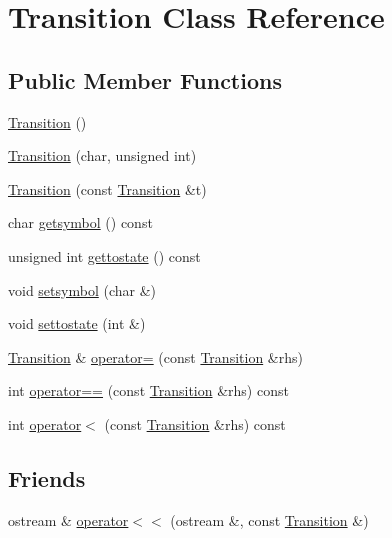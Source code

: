 \hypertarget{classTransition}{}\section{Transition Class Reference}
\label{classTransition}
\subsection*{Public Member Functions}
\begin{DoxyCompactItemize}
\item 
\hyperlink{classTransition_a73b44b2338b11807f77b620a3e810f92}{Transition} ()
\item 
\hyperlink{classTransition_ab49cf908eba3466ddcd65b144d3c2fc4}{Transition} (char, unsigned int)
\item 
\hyperlink{classTransition_a3a95a02ec9471b3af89c3f1b947048fc}{Transition} (const \hyperlink{classTransition}{Transition} \&t)
\item 
char \hyperlink{classTransition_a26d9d8a40925443d053594fedeae812f}{getsymbol} () const 
\item 
unsigned int \hyperlink{classTransition_a2cd33705526d2cf4806605b5bd18c46b}{gettostate} () const 
\item 
void \hyperlink{classTransition_a5a20b15b7f4ab032742ad6391190cc6e}{setsymbol} (char \&)
\item 
void \hyperlink{classTransition_a6534cb4975a33db21fc273e578c32ff1}{settostate} (int \&)
\item 
\hyperlink{classTransition}{Transition} \& \hyperlink{classTransition_aff02d7ec6996e757e62e863f09dda47e}{operator=} (const \hyperlink{classTransition}{Transition} \&rhs)
\item 
int \hyperlink{classTransition_a0eb7dbe96740da9acc628b90c28932ee}{operator==} (const \hyperlink{classTransition}{Transition} \&rhs) const 
\item 
int \hyperlink{classTransition_a858e1b8e385b0fd83fdd5719c56cb50f}{operator$<$} (const \hyperlink{classTransition}{Transition} \&rhs) const 
\end{DoxyCompactItemize}
\subsection*{Friends}
\begin{DoxyCompactItemize}
\item 
ostream \& \hyperlink{classTransition_ab1393a65ad3451f1fb24f8fbf1f4247f}{operator$<$$<$} (ostream \&, const \hyperlink{classTransition}{Transition} \&)
\end{DoxyCompactItemize}


